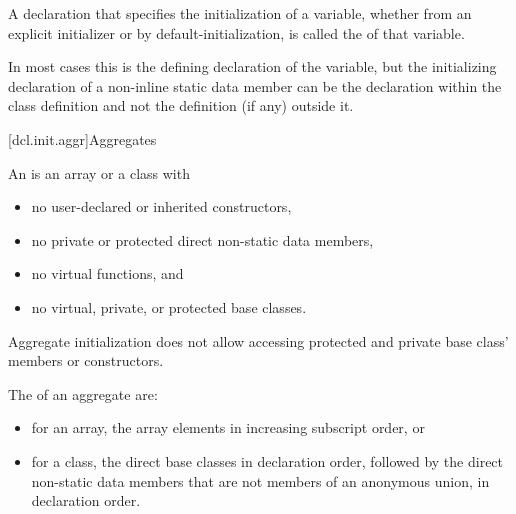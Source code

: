 \pnum
A declaration that specifies the initialization of a variable,
whether from an explicit initializer or by default-initialization,
is called the  of that variable.
\begin{note}
In most cases
this is the defining declaration of the variable,
but the initializing declaration
of a non-inline static data member
can be the declaration within the class definition
and not the definition (if any) outside it.
\end{note}

[dcl.init.aggr]{Aggregates}%
%
%
%
%
%
%

\pnum
An  is an array or a class with
\begin{itemize}
\item
no user-declared or inherited constructors,
\item
no private or protected direct non-static data members,
\item
no virtual functions, and
\item
no virtual, private, or protected base classes.
\end{itemize}
\begin{note}
Aggregate initialization does not allow accessing
protected and private base class' members or constructors.
\end{note}

\pnum
The  of an aggregate are:
\begin{itemize}
\item
for an array, the array elements in increasing subscript order, or
\item
for a class, the direct base classes in declaration order,
followed by the direct non-static data members
that are not members of an anonymous union, in declaration order.
\end{itemize}

